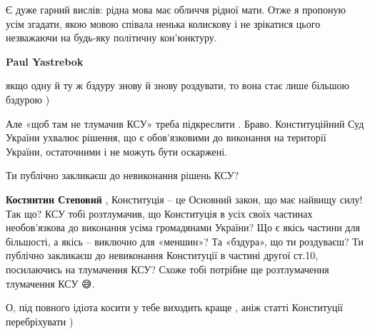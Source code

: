 \begin{itemize}
\begin{itemize}
Є дуже гарний вислів: рідна мова має обличчя рідної мати. Отже я пропоную усім
згадати, якою мовою співала ненька колискову і не зрікатися цього незважаючи на
будь-яку політичну кон’юнктуру.

 
\textbf{Paul Yastrebok} 

якщо одну й ту ж бздуру знову й знову роздувати, то вона стає лише більшою
бздурою )

Але «щоб там не тлумачив КСУ» треба підкреслити . Браво. Конституційний Суд
України ухвалює рішення, що є обов’язковими до виконання на території України,
остаточними і не можуть бути оскаржені.

Ти публічно закликаєш до невиконання рішень КСУ?

 
\textbf{Костянтин Степовий} , Конституція – це Основний закон, що має найвищу силу! Так що? КСУ тобі розтлумачив, що Конституція в усіх своїх частинах необов’язкова до виконання усіма громадянами України? Що є якісь частини для більшості, а якісь – виключно для «меншин»? Та «бздура», що ти роздуваєш? Ти публічно закликаєш до невиконання Конституції в частині другої ст.10, посилаючись на тлумачення КСУ? Схоже тобі потрібне ще розтлумачення тлумачення КСУ 😅.

 
О, під повного ідіота косити у тебе виходить краще , аніж статті Конституції перебріхувати )

 

\end{itemize}
\end{itemize}
